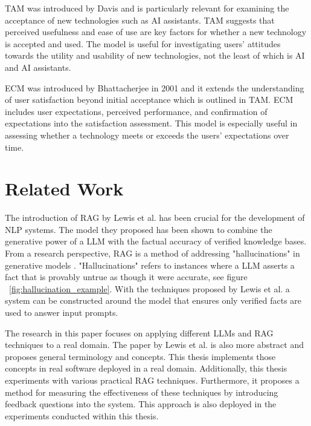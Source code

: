 \gls{TAM} was introduced by Davis \cite{davis_perceived_1989} and is particularly relevant for examining the acceptance of new technologies such as AI assistants. \gls{TAM} suggests that perceived usefulness and ease of use are key factors for whether a new technology is accepted and used. The model is useful for investigating users' attitudes towards the utility and usability of new technologies, not the least of which is AI and AI assistants.


\gls{ECM} was introduced by Bhattacherjee \cite{bhattacherjee_understanding_2001} in 2001 and it extends the understanding of user satisfaction beyond initial acceptance which is outlined in \gls{TAM}. \gls{ECM} includes user expectations, perceived performance, and confirmation of expectations into the satisfaction assessment. This model is especially useful in assessing whether a technology meets or exceeds the users' expectations over time.


\section{Related Work}
\label{sec:related_work}




The introduction of \gls{RAG} by Lewis et al. has been crucial for the development of \gls{NLP} systems. The model they proposed has been shown to combine the generative power of a \gls{LLM} with the factual accuracy of verified knowledge bases. From a research perspective, \gls{RAG} is a method of addressing "hallucinations" in generative models \cite{lewis_retrieval-augmented_2020}. "Hallucinations" refers to instances where a \gls{LLM} asserts a fact that is provably untrue as though it were accurate, see figure ~\ref{fig:hallucination_example}. With the techniques proposed by Lewis et al. a system can be constructed around the model that ensures only verified facts are used to answer input prompts.


The research in this paper focuses on applying different \gls{LLM}s and \gls{RAG} techniques to a real domain. The paper by Lewis et al. is also more abstract and proposes general terminology and concepts. This thesis implements those concepts in real software deployed in a real domain. Additionally, this thesis experiments with various practical \gls{RAG} techniques. Furthermore, it proposes a method for measuring the effectiveness of these techniques by introducing feedback questions into the system. This approach is also deployed in the experiments conducted within this thesis.


